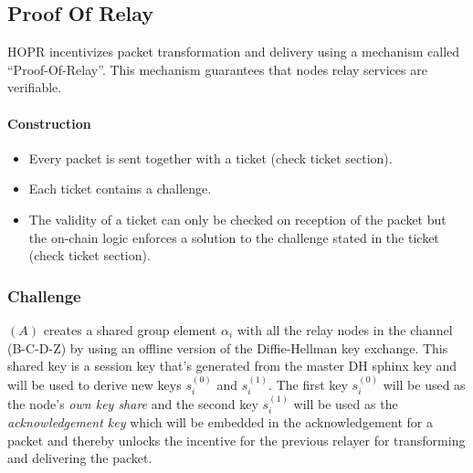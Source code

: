 \subsection{Proof Of Relay}
\label{sec:proofofrelay}

HOPR incentivizes packet transformation and delivery using a mechanism called
“Proof-Of-Relay”. This mechanism guarantees that nodes relay services are
verifiable.

\paragraph{Construction}
\begin{itemize}
    \item Every packet is sent together with a ticket (check ticket section).
    \item Each ticket contains a challenge.
    \item The validity of a ticket can only be checked on reception of the packet but the on-chain logic enforces a solution to the challenge stated in the ticket (check ticket section).
\end{itemize}

\subsubsection{Challenge}

$(A)$ creates a shared group element $\alpha_i$ with all the relay nodes in the channel (B-C-D-Z) by using an offline version of the Diffie-Hellman key exchange. This shared key is a session key that's generated from the master DH sphinx key and will be used to derive new keys $s_i^{(0)}$ and $s_{i}^{(1)}$. 
The first key $s_i^{(0)}$ will be used as the node's \textit{own key share} and the second key $s_i^{(1)}$ will be used as the \textit{acknowledgement key} which will be embedded in the acknowledgement for a packet and thereby unlocks the incentive for the previous relayer for transforming and delivering the packet.
